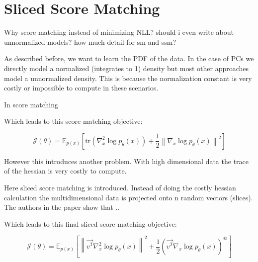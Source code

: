 \section{Sliced Score Matching}
\label{sec:ssm}

Why score matching instead of minimizing NLL? should i even write about unnormalized models?
how much detail for sm and ssm? 

As described before, we want to learn the PDF of the data. In the case of PCs we directly model a normalized (integrates to 1)
density but most other approaches model a unnormalized density. This is because the normalization constant is 
very costly or impossible to compute in these scenarios. 

In score matching \cite{score_matching} 

Which leads to this score matching objective: 

\begin{equation}
    \label{eq:sm_objective}
    \mathcal{J}(\theta) = \mathbb{E}_{p(x)} \left[\text{tr} \left( \nabla_x^2 \log p_\theta(x) \right) + \frac{1}{2} \left\| \nabla_x \log p_\theta(x) \right\|^2 \right]
\end{equation}


However this introduces another problem. With high dimensional data the trace of the hessian is very costly to compute.

Here sliced score matching \cite{sliced_score_matching} is introduced. Instead of doing the costly hessian calculation
the multidimensional data is projected onto n random vectors (slices). The authors in the paper show that ..

Which leads to this final sliced score matching objective: 

\begin{equation}
    \label{eq:sm_objective}
    \mathcal{J}(\theta) = \mathbb{E}_{p(x)} \left[  \left\| \vec{v^T} \nabla_x^2 \log p_\theta(x) \right\|^2 + \frac{1}{2} \left( \vec{v^T} \nabla_x \log p_\theta(x) \right)^@ \right]
\end{equation}







